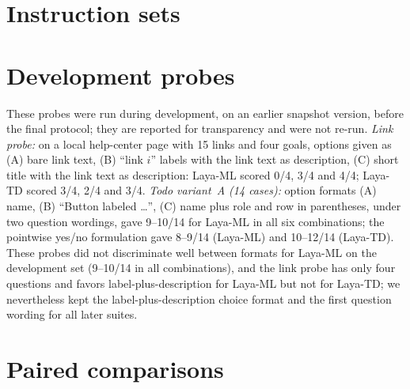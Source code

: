 \documentclass[11pt,a4paper]{article}
\begin{document}
\section{Instruction sets}\label{app:instr}
\begin{table}[ht]\centering\small\caption{Todo suite instructions.}\end{table}
\begin{table}[ht]\centering\small\caption{Checkout suite instructions (dummy field values).}\end{table}
\begin{table}[ht]\centering\small\caption{Live suite instructions.}\end{table}

\section{Development probes}\label{app:dev}
These probes were run during development, on an earlier snapshot version, before the final protocol; they are reported for transparency and were not re-run. \emph{Link probe:} on a local help-center page with 15 links and four goals, options given as (A) bare link text, (B) ``link $i$'' labels with the link text as description, (C) short title with the link text as description: Laya-ML scored 0/4, 3/4 and 4/4; Laya-TD scored 3/4, 2/4 and 3/4. \emph{Todo variant~A (14 cases):} option formats (A) name, (B) ``Button labeled \ldots'', (C) name plus role and row in parentheses, under two question wordings, gave 9--10/14 for Laya-ML in all six combinations; the pointwise yes/no formulation gave 8--9/14 (Laya-ML) and 10--12/14 (Laya-TD). These probes did not discriminate well between formats for Laya-ML on the development set (9--10/14 in all combinations), and the link probe has only four questions and favors label-plus-description for Laya-ML but not for Laya-TD; we nevertheless kept the label-plus-description choice format and the first question wording for all later suites.

\section{Paired comparisons}
\begin{table}[h]\centering\small
\caption{All 15 grounder pairs on the 88 discriminative cases: difference in accuracy, 95\% instruction-level (cluster) bootstrap interval, sign-flip permutation $p$ over 32 instructions, and Holm-adjusted $p$.}\label{tab:paired}\end{table}
\end{document}
